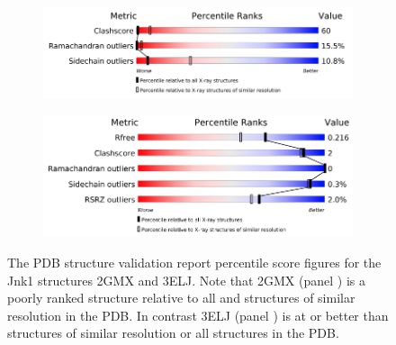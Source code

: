 \documentclass[9pt,bestpractices]{livecoms}
\begin{document}
\begin{figure}
    \centering
    \begin{subfigure}[b]{0.48\textwidth}
        \includegraphics[width=\textwidth]{crystal/Jnk1_2gmx_pdb_report.png}
        \caption{}
        \label{fig:jnk1_pdb_report_2gmx}
    \end{subfigure}
    
    \begin{subfigure}[b]{0.48\textwidth}
        \includegraphics[width=\textwidth]{crystal/Jnk1_3elj_pdb_report.png}
        \caption{}
        \label{fig:jnk1_pdb_report_3elj}
    \end{subfigure}
    \caption{The PDB structure validation report percentile score figures for the Jnk1 structures 2GMX and 3ELJ.  Note that 2GMX (panel ) is a poorly ranked structure relative to all and structures of similar resolution in the PDB.  In contrast 3ELJ (panel ) is at or better than structures of similar resolution or all structures in the PDB.}
    \label{fig:jnk1_pdb_report}
\end{figure}
\end{document}
